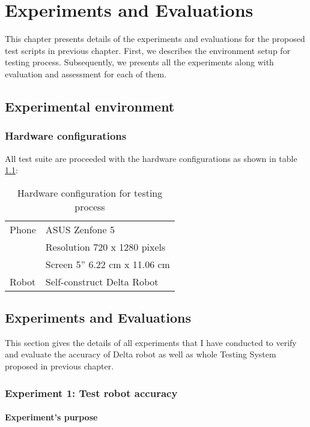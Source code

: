 \chapter{Experiments and Evaluations}
\label{ch:experiments}

This chapter presents details of the experiments and evaluations for the proposed test scripts in previous chapter.
First, we describes the environment setup for testing process.
Subsequently, we presents all the experiments along with evaluation and assessment for each of them.

\section{Experimental environment}

\subsection{Hardware configurations}
All test suite are proceeded with the hardware configurations as shown in table \ref{tab:hw}:

\begin{table}[H]
	\centering
	\caption{Hardware configuration for testing process}	
	\label{tab:hw}
	\begin{tabularx}{0.65\textwidth}{ll}
		\toprule
		Phone & ASUS Zenfone 5 \\
			  & Resolution 720 x 1280 pixels \\
			  & Screen 5'' 6.22 cm x 11.06 cm \\
		\midrule 
		Robot & Self-construct Delta Robot \\
		\bottomrule
	\end{tabularx}
\end{table}

\section{Experiments and Evaluations}
This section gives the details of all experiments that I have conducted to verify and evaluate the accuracy of Delta robot as well as whole Testing System proposed in previous chapter. 

\subsection{Experiment 1: Test robot accuracy}
\subsubsection{Experiment's purpose}

